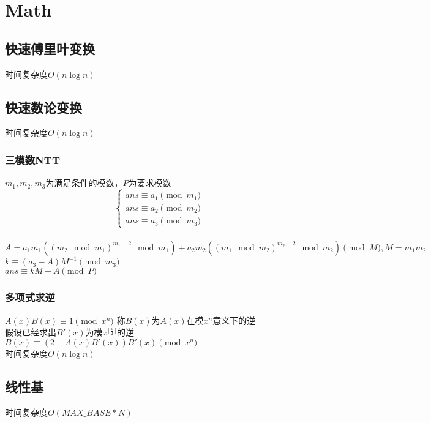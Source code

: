\section{Math}

\subsection{快速傅里叶变换}
时间复杂度$O(n \log n)$\\


\subsection{快速数论变换}
时间复杂度$O(n\log n)$\\


\subsubsection{三模数NTT}
$m_1,m_2,m_3$为满足条件的模数，$P$为要求模数\\
$$
 \left\{
\begin{aligned}
ans \equiv a_1 \pmod{m_1} \\
ans \equiv a_2 \pmod{m_2} \\
ans \equiv a_3 \pmod{m_3}
\end{aligned}
\right.
$$\\
$A = a_1m_1((m_2 \mod m_1)^{m_1-2}\mod m_1) + a_2m_2((m_1 \mod m_2)^{m_2-2}\mod m_2) \pmod{M}, M = m_1m_2$\\
$k \equiv (a_3-A)M^{-1} \pmod{m_3}$\\
$ans \equiv kM + A \pmod{P}$\\



\subsubsection{多项式求逆}
$A(x)B(x)\equiv 1 \pmod{x^n}$ 称$B(x)$为$A(x)$在模$x^n$意义下的逆\\
假设已经求出$B'(x)$为模$x^{\lceil\frac{x}{2}\rceil}$的逆\\
$B(x)\equiv (2-A(x)B'(x))B'(x) \pmod{x^{n}}$\\
时间复杂度$O(n\log n)$\\


\subsection{线性基}
时间复杂度$O(MAX\_BASE*N)$\\
